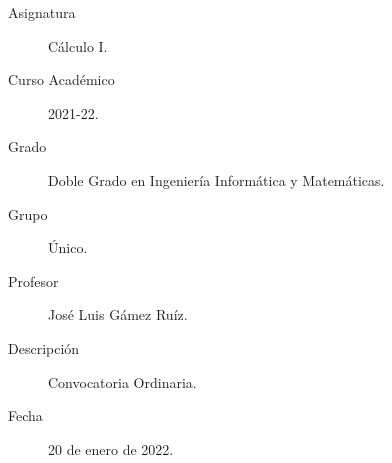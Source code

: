 \documentclass[12pt]{article}
\begin{document}

    
    

    \begin{description}
        \item[Asignatura] Cálculo I.
        \item[Curso Académico] 2021-22.
        \item[Grado] Doble Grado en Ingeniería Informática y Matemáticas.
        \item[Grupo] Único.
        \item[Profesor] José Luis Gámez Ruíz.
        \item[Descripción] Convocatoria Ordinaria.
        \item[Fecha] 20 de enero de 2022.
    
    \end{description}
    \newpage
    
\end{document}
